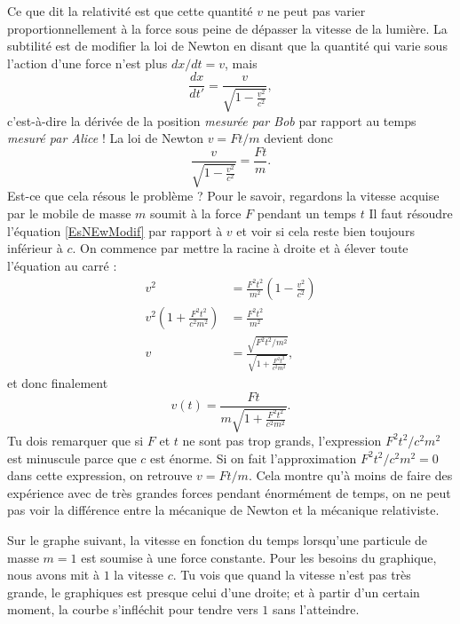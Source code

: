 Ce que dit la relativité est que cette quantité $v$ ne peut pas varier proportionnellement à la force sous peine de dépasser la vitesse de la lumière. La subtilité est de modifier la loi de Newton en disant que la quantité qui varie sous l'action d'une force n'est plus $dx/dt=v$, mais
\[
	\frac{ dx }{ dt' }=   \frac{ v }{ \sqrt{1-\frac{ v^2 }{ c^2 }} },
\]
c'est-à-dire la dérivée de la position \emph{mesurée par Bob} par rapport au temps \emph{mesuré par Alice} !  La loi de Newton $v=Ft/m$ devient donc
\begin{equation}	\label{EsNEwModif}
\frac{ v }{ \sqrt{1-\frac{ v^2 }{ c^2 }} }=\frac{ Ft }{ m }.
\end{equation}
Est-ce que cela résous le problème ? Pour le savoir, regardons la vitesse acquise par le mobile de masse $m$ soumit à la force $F$ pendant un temps $t$ Il faut résoudre l'équation \eqref{EsNEwModif} par rapport à $v$ et voir si cela reste bien toujours inférieur à $c$. On commence par mettre la racine à droite et à élever toute l'équation au carré :
\[
\begin{split}
v^2&=\frac{ F^2t^2 }{ m^2 }\left( 1-\frac{ v^2 }{ c^2 } \right)\\
v^2\left( 1+\frac{ F^2t^2 }{ c^2m^2 } \right)&=\frac{ F^2t^2 }{ m^2 }\\
v&=\frac{ \sqrt{F^2t^2/m^2} }{ \sqrt{1+\frac{ F^2t^2 }{ c^2m^2 }} },
\end{split}
\]
et donc finalement
\begin{equation}	\label{EqVfntRel}
v(t)=\frac{ Ft }{ m\sqrt{1+\frac{ F^2t^2 }{ c^2m^2 }} }.
\end{equation}
Tu dois remarquer que si $F$ et $t$ ne sont pas trop grands, l'expression $F^2t^2/c^2m^2$ est minuscule parce que $c$ est énorme. Si on fait l'approximation $F^2t^2/c^2m^2=0$ dans cette expression, on retrouve $v=Ft/m$. Cela montre qu'à moins de faire des expérience avec de très grandes forces pendant énormément de temps, on ne peut pas voir la différence entre la mécanique de Newton et la mécanique relativiste.

\begin{center}
   
\end{center}

Sur le graphe suivant, la vitesse en fonction du temps lorsqu'une particule de masse \( m=1\) est soumise à une force constante. Pour les besoins du graphique, nous avons mit à $1$ la vitesse $c$. Tu vois que quand la vitesse n'est pas très grande, le graphiques est presque celui d'une droite; et à partir d'un certain moment, la courbe s'infléchit pour tendre vers $1$ sans l'atteindre.

